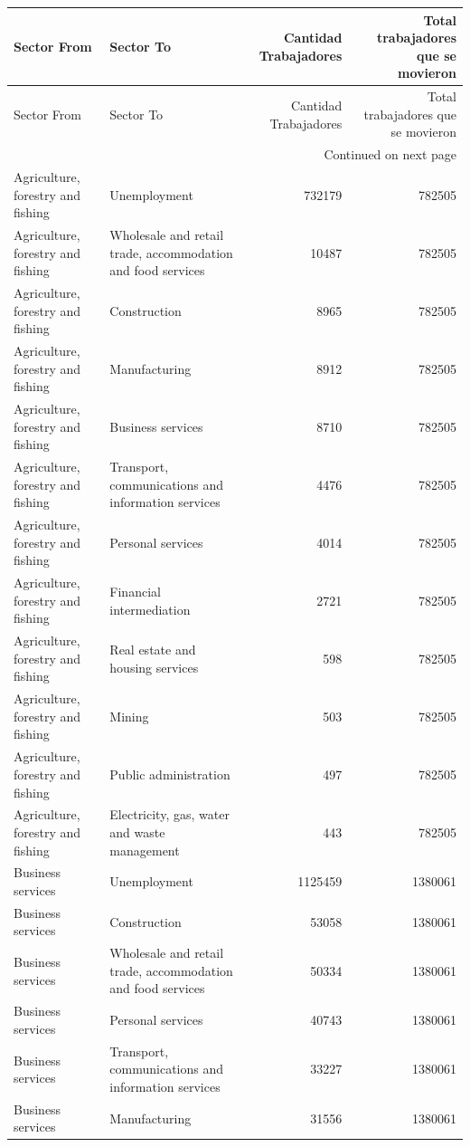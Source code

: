 \begin{longtable}{llrr}
\toprule
Sector From & Sector To & Cantidad Trabajadores & Total trabajadores que se movieron \\
\midrule
\endfirsthead
\toprule
Sector From & Sector To & Cantidad Trabajadores & Total trabajadores que se movieron \\
\midrule
\endhead
\midrule
\multicolumn{4}{r}{Continued on next page} \\
\midrule
\endfoot
\bottomrule
\endlastfoot
Agriculture, forestry and fishing & Unemployment & 732179 & 782505 \\
Agriculture, forestry and fishing & Wholesale and retail trade, accommodation and food services & 10487 & 782505 \\
Agriculture, forestry and fishing & Construction & 8965 & 782505 \\
Agriculture, forestry and fishing & Manufacturing & 8912 & 782505 \\
Agriculture, forestry and fishing & Business services & 8710 & 782505 \\
Agriculture, forestry and fishing & Transport, communications and information services & 4476 & 782505 \\
Agriculture, forestry and fishing & Personal services & 4014 & 782505 \\
Agriculture, forestry and fishing & Financial intermediation & 2721 & 782505 \\
Agriculture, forestry and fishing & Real estate and housing services & 598 & 782505 \\
Agriculture, forestry and fishing & Mining & 503 & 782505 \\
Agriculture, forestry and fishing & Public administration & 497 & 782505 \\
Agriculture, forestry and fishing & Electricity, gas, water and waste management & 443 & 782505 \\
Business services & Unemployment & 1125459 & 1380061 \\
Business services & Construction & 53058 & 1380061 \\
Business services & Wholesale and retail trade, accommodation and food services & 50334 & 1380061 \\
Business services & Personal services & 40743 & 1380061 \\
Business services & Transport, communications and information services & 33227 & 1380061 \\
Business services & Manufacturing & 31556 & 1380061 \\

\end{longtable}
